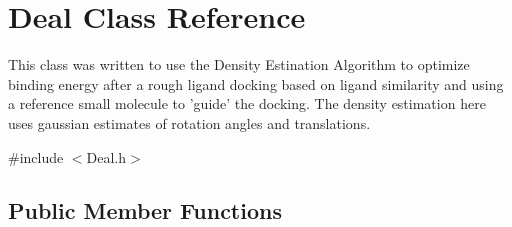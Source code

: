 \hypertarget{classDeal}{
\section{Deal Class Reference}
\label{classDeal}
}


This class was written to use the Density Estination Algorithm to optimize binding energy after a rough ligand docking based on ligand similarity and using a reference small molecule to 'guide' the docking. The density estimation here uses gaussian estimates of rotation angles and translations.  


{\ttfamily \#include $<$Deal.h$>$}\subsection*{Public Member Functions}
